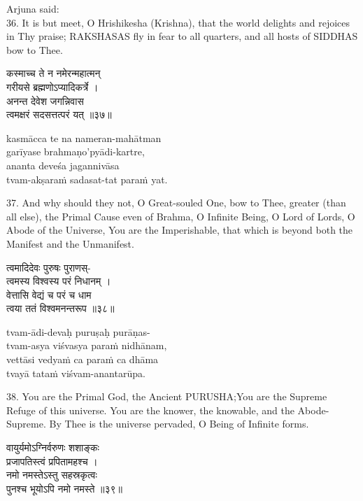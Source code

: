 Arjuna said: \\
36. It is but meet, O Hrishikesha (Krishna), that the world delights and
rejoices in Thy praise; RAKSHASAS fly in fear to all quarters, and all hosts of
SIDDHAS bow to Thee.

\begin{gitaverse}
कस्माच्च ते न नमेरन्महात्मन् \\
\tab गरीयसे ब्रह्मणोऽप्यादिकर्त्रे । \\
अनन्त देवेश जगन्निवास \\
\tab त्वमक्षरं सदसत्तत्परं यत् ॥३७॥
\end{gitaverse}

\begin{transliteration}
kasmācca te na nameran-mahātman \\
\tab garīyase brahmaṇo'pyādi-kartre, \\
ananta deveśa jagannivāsa \\
\tab tvam-akṣaraṁ sadasat-tat paraṁ yat.
\end{transliteration}

37. And why should they not, O Great-souled One, bow to Thee, greater (than all
else), the Primal Cause even of Brahma, O Infinite Being, O Lord of Lords, O
Abode of the Universe, You are the Imperishable, that which is beyond both the
Manifest and the Unmanifest.

\begin{gitaverse}
त्वमादिदेवः पुरुषः पुराणस्- \\
\tab त्वमस्य विश्वस्य परं निधानम् । \\
वेत्तासि वेद्यं च परं च धाम \\
\tab त्वया ततं विश्वमनन्तरूप ॥३८॥
\end{gitaverse}

\begin{transliteration}
tvam-ādi-devaḥ puruṣaḥ purāṇas- \\
\tab tvam-asya viśvasya paraṁ nidhānam, \\
vettāsi vedyaṁ ca paraṁ ca dhāma \\
\tab tvayā tataṁ viśvam-anantarūpa.
\end{transliteration}

38. You are the Primal God, the Ancient PURUSHA;\@ You are the Supreme Refuge
of this universe. You are the knower, the knowable, and the Abode-Supreme. By
Thee is the universe pervaded, O Being of Infinite forms.

\begin{gitaverse}
वायुर्यमोऽग्निर्वरुणः शशाङ्कः \\
\tab प्रजापतिस्त्वं प्रपितामहश्च । \\
नमो नमस्तेऽस्तु सहस्रकृत्वः \\
\tab पुनश्च भूयोऽपि नमो नमस्ते ॥३९॥
\end{gitaverse}


